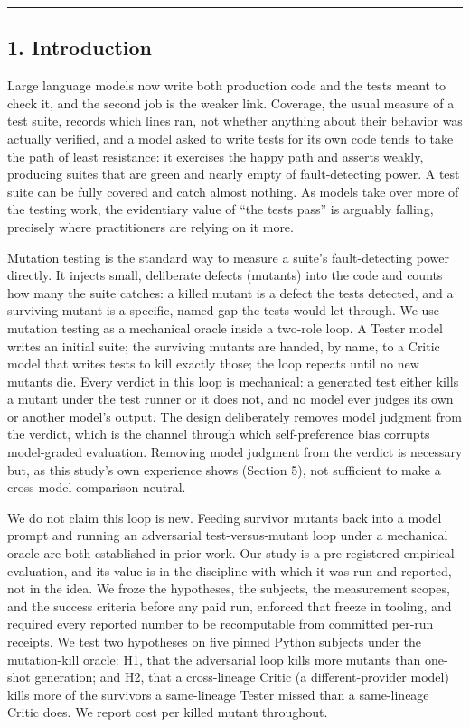 \documentclass[
  11pt,
]{article}
\begin{document}
\begin{center}\rule{0.5\linewidth}{0.5pt}\end{center}

\subsection{1. Introduction}\label{introduction}

Large language models now write both production code and the tests meant
to check it, and the second job is the weaker link. Coverage, the usual
measure of a test suite, records which lines ran, not whether anything
about their behavior was actually verified, and a model asked to write
tests for its own code tends to take the path of least resistance: it
exercises the happy path and asserts weakly, producing suites that are
green and nearly empty of fault-detecting power. A test suite can be
fully covered and catch almost nothing. As models take over more of the
testing work, the evidentiary value of ``the tests pass'' is arguably
falling, precisely where practitioners are relying on it more.

Mutation testing is the standard way to measure a suite's
fault-detecting power directly. It injects small, deliberate defects
(mutants) into the code and counts how many the suite catches: a killed
mutant is a defect the tests detected, and a surviving mutant is a
specific, named gap the tests would let through. We use mutation testing
as a mechanical oracle inside a two-role loop. A Tester model writes an
initial suite; the surviving mutants are handed, by name, to a Critic
model that writes tests to kill exactly those; the loop repeats until no
new mutants die. Every verdict in this loop is mechanical: a generated
test either kills a mutant under the test runner or it does not, and no
model ever judges its own or another model's output. The design
deliberately removes model judgment from the verdict, which is the
channel through which self-preference bias corrupts model-graded
evaluation. Removing model judgment from the verdict is necessary but,
as this study's own experience shows (Section 5), not sufficient to make
a cross-model comparison neutral.

We do not claim this loop is new. Feeding survivor mutants back into a
model prompt and running an adversarial test-versus-mutant loop under a
mechanical oracle are both established in prior work. Our study is a
pre-registered empirical evaluation, and its value is in the discipline
with which it was run and reported, not in the idea. We froze the
hypotheses, the subjects, the measurement scopes, and the success
criteria before any paid run, enforced that freeze in tooling, and
required every reported number to be recomputable from committed per-run
receipts. We test two hypotheses on five pinned Python subjects under
the mutation-kill oracle: H1, that the adversarial loop kills more
mutants than one-shot generation; and H2, that a cross-lineage Critic (a
different-provider model) kills more of the survivors a same-lineage
Tester missed than a same-lineage Critic does. We report cost per killed
mutant throughout.
\end{document}
